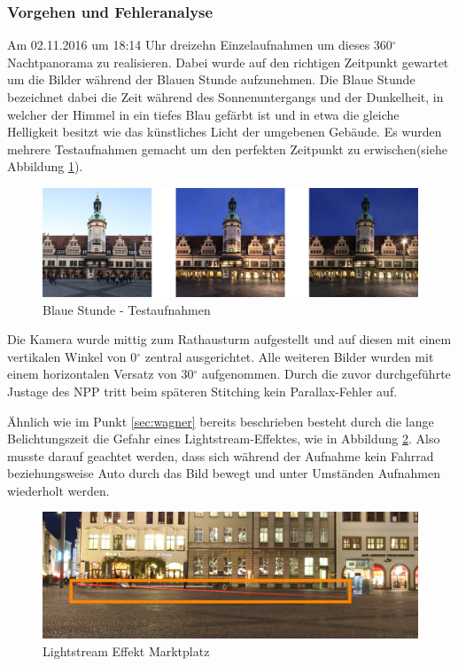 \documentclass[liststotoc,bibtotoc,fontsize=14pt,]{scrreprt}
\begin{document}
		\subsubsection{Vorgehen und Fehleranalyse}
		Am 02.11.2016 um 18:14 Uhr dreizehn Einzelaufnahmen um dieses 360$^\circ$ Nachtpanorama zu realisieren. Dabei wurde auf den richtigen Zeitpunkt gewartet um die Bilder während der Blauen Stunde aufzunehmen. Die Blaue Stunde bezeichnet dabei die Zeit während des Sonnenuntergangs und der Dunkelheit, in welcher der Himmel in ein tiefes Blau gefärbt ist und in etwa die gleiche Helligkeit besitzt wie das  künstliches Licht der umgebenen Gebäude. Es wurden mehrere Testaufnahmen gemacht um den perfekten Zeitpunkt zu erwischen(siehe Abbildung \ref{img:bs}).
		
		\begin{figure}[H]
			\includegraphics[width=\linewidth]{img/bs.jpg}
			\caption{Blaue Stunde - Testaufnahmen}
			\label{img:bs}
		\end{figure}
		
		Die Kamera wurde mittig zum Rathausturm aufgestellt und auf diesen mit einem vertikalen Winkel von 0$^\circ$ zentral ausgerichtet. Alle weiteren Bilder wurden mit einem horizontalen Versatz von 30$^\circ$ aufgenommen. Durch die zuvor durchgeführte Justage des NPP tritt beim späteren Stitching kein Parallax-Fehler auf. 
		
		\bigskip
		Ähnlich wie im Punkt \ref{sec:wagner} bereits beschrieben besteht durch die lange Belichtungszeit die Gefahr eines Lightstream-Effektes, wie in Abbildung \ref{img:ls-m}. Also musste darauf geachtet werden, dass sich während der Aufnahme kein Fahrrad beziehungsweise Auto durch das Bild bewegt und unter Umständen Aufnahmen wiederholt werden. 

		\begin{figure}[H]
			\includegraphics[width=\linewidth]{img/ls-m.jpg}
			\caption{Lightstream Effekt Marktplatz}
			\label{img:ls-m}
		\end{figure}
\end{document}
